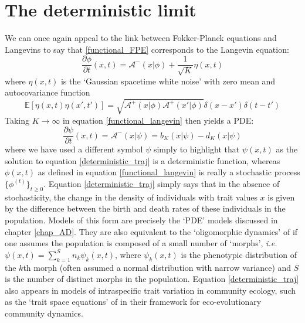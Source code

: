 \section{The deterministic limit}
We can once again appeal to the link between Fokker-Planck equations and Langevins \citep{lafuerza_role_2016} to say that \eqref{functional_FPE} corresponds to the Langevin equation:
\begin{equation}
\label{functional_langevin}
    \frac{\partial \phi}{\partial t}(x,t) = \mathcal{A}^{-}(x|\phi) + \frac{1}{\sqrt{K}}\eta(x,t)
\end{equation}
where $\eta(x,t)$  is the `Gaussian spacetime white noise' with zero mean and autocovariance function
\begin{equation*}
    \mathbb{E}[\eta(x,t)\eta(x',t')] = \sqrt{\mathcal{A}^{+}(x|\phi)\mathcal{A}^{+}(x'|\phi)}\delta(x-x')\delta(t-t')
\end{equation*}
Taking $K \to \infty$ in equation \eqref{functional_langevin} then yields a PDE:
\begin{equation}
\label{deterministic_traj}
\frac{\partial \psi}{\partial t}(x,t) = \mathcal{A}^{-}\left(x|\psi\right) = b_K(x|\psi)- d_K(x|\psi)
\end{equation}
where we have used a different symbol $\psi$ simply to highlight that $\psi(x,t)$ as the solution to equation \eqref{deterministic_traj} is a deterministic function, whereas $\phi(x,t)$ as defined in equation \eqref{functional_langevin} is really a stochastic process $\{\phi^{(t)}\}_{t\geq0}$. Equation \eqref{deterministic_traj} simply says that in the absence of stochasticity, the change in the density of individuals with trait values $x$ is given by the difference between the birth and death rates of these individuals in the population. Models of this form are precisely the `PDE' models discussed in chapter \ref{chap_AD}. They are also equivalent to the `oligomorphic dynamics' of \citep{sasaki_oligomorphic_2011} if one assumes the population is composed of a small number of `morphs', \emph{i.e.} $\psi(x,t) = \sum\limits_{k=1}^{S} n_{k}\psi_k(x,t)$, where $\psi_k(x,t)$ is the phenotypic distribution of the $k$th morph (often assumed a normal distribution with narrow variance) and $S$ is the number of distinct morphs in the population. Equation \eqref{deterministic_traj} also appears in models of intraspecific trait variation in community ecology, such as the `trait space equations' of \citep{wickman_theoretical_2022} in their framework for eco-evolutionary community dynamics.\\
